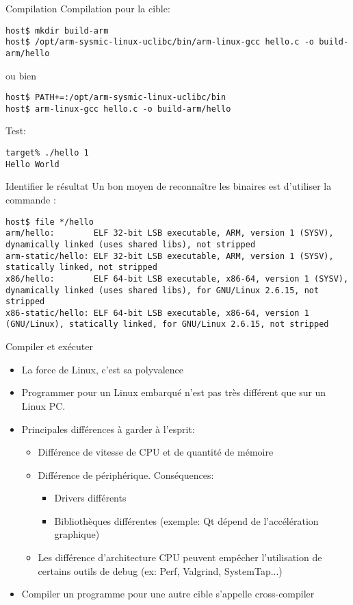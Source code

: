 \begin{frame}[fragile=singleslide]{Compilation}
  Compilation pour la cible:
  \begin{lstlisting}
host$ mkdir build-arm
host$ /opt/arm-sysmic-linux-uclibc/bin/arm-linux-gcc hello.c -o build-arm/hello
  \end{lstlisting}
  ou bien
  \begin{lstlisting}
host$ PATH+=:/opt/arm-sysmic-linux-uclibc/bin
host$ arm-linux-gcc hello.c -o build-arm/hello
  \end{lstlisting}
  Test:
  \begin{lstlisting}
target% ./hello 1
Hello World
  \end{lstlisting} %
\end{frame}

\begin{frame}[fragile=singleslide]{Identifier le résultat}
  Un bon moyen de reconnaître  les binaires est d'utiliser la commande
  :
\begin{lstlisting}
host$ file */hello
arm/hello:        ELF 32-bit LSB executable, ARM, version 1 (SYSV), dynamically linked (uses shared libs), not stripped
arm-static/hello: ELF 32-bit LSB executable, ARM, version 1 (SYSV), statically linked, not stripped
x86/hello:        ELF 64-bit LSB executable, x86-64, version 1 (SYSV), dynamically linked (uses shared libs), for GNU/Linux 2.6.15, not stripped
x86-static/hello: ELF 64-bit LSB executable, x86-64, version 1 (GNU/Linux), statically linked, for GNU/Linux 2.6.15, not stripped
\end{lstlisting} %
\end{frame}

\begin{frame}{Compiler et exécuter}
  \begin{itemize}
  \item La force de Linux, c'est sa polyvalence
  \item Programmer  pour un Linux  embarqué n'est pas  très différent
    que sur un Linux PC.
  \item Principales différences à garder à l'esprit:
    \begin{itemize}
    \item Différence de vitesse de CPU et de quantité de mémoire
    \item Différence de périphérique. Conséquences:
      \begin{itemize}
      \item Drivers différents
      \item   Bibliothèques   différentes   (exemple:  Qt   dépend   de
        l'accélération graphique)
      \end{itemize}
    \item   Les  différence   d'architecture   CPU  peuvent   empêcher
      l'utilisation de  certains outils de debug  (ex: Perf, Valgrind,
      SystemTap...)
    \end{itemize}
  \item  Compiler   un  programme  pour  une   autre  cible  s'appelle
    cross-compiler
  \end{itemize}
\end{frame}

